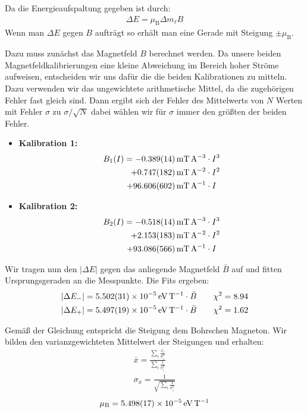 \documentclass[11pt, a4paper]{article}
\begin{document}
Da die Energieaufspaltung gegeben ist durch:
\begin{align}
	\Delta E = \mu_\mathrm{B} \Delta m_\ell B
\end{align}
Wenn man $\Delta E$ gegen $B$ aufträgt so erhält man eine Gerade mit Steigung $\pm \mu_\mathrm{B}$.

Dazu muss zunächst das Magnetfeld $B$ berechnet werden.
Da unsere beiden Magnetfeldkalibrierungen eine kleine Abweichung im Bereich hoher Ströme aufweisen, entscheiden wir uns dafür die die beiden Kalibrationen zu mitteln.
Dazu verwenden wir das ungewichtete arithmetische Mittel, da die zugehörigen Fehler fast gleich sind.
Dann ergibt sich der Fehler des Mittelwerts von $N$ Werten mit Fehler $\sigma$ zu $\sigma/\sqrt{N}$ dabei wählen wir für $\sigma$ immer den größten der beiden Fehler.

\begin{itemize}
	\item \textbf{Kalibration 1:}
	\begin{align}
	B_1(I) = \SI{-0.389 +- 0.014}{\milli\tesla\per\ampere\cubed} &\cdot I^3 \nonumber\\
	       +\SI{0.747+-0.182}{\milli\tesla\per\ampere\squared} &\cdot I^2 \nonumber\\
	       + \SI{96.606 +- 0.602}{\milli\tesla\per\ampere} &\cdot I
	\end{align}
	\item \textbf{Kalibration 2:}
	\begin{align}
	B_2(I) = \SI{-0.518 +- 0.014}{\milli\tesla\per\ampere\cubed} &\cdot I^3 \nonumber\\
	+\SI{2.153+-0.183}{\milli\tesla\per\ampere\squared} &\cdot I^2 \nonumber\\
	+ \SI{93.086 +- 0.566}{\milli\tesla\per\ampere} &\cdot I
	\end{align}
\end{itemize}

Wir tragen nun den $|\Delta E|$ gegen das anliegende Magnetfeld $\bar{B}$ auf und fitten Ursprungsgeraden an die Messpunkte.
Die Fits ergeben:
\begin{align}
	|\Delta E_{-}| = \SI{5.502 +- 0.031e-5}{\electronvolt\per\tesla} \cdot \bar{B} \qquad \chi^2 = 8.94\\
	|\Delta E_{+}| = \SI{5.497 +- 0.019e-5}{\electronvolt\per\tesla} \cdot \bar{B} \qquad \chi^2 = 1.62
\end{align}

Gemäß der Gleichung entspricht die Steigung dem Bohrschen Magneton. Wir bilden den varianzgewichteten Mittelwert der Steigungen und erhalten:
\begin{align}
	\bar{x} = \frac{\sum_i \frac{x_i}{\sigma_i^2}}{\sum_i \frac{1}{\sigma_i^2}} \\
	\sigma_{\bar{x}} = \frac{1}{\sqrt{\sum_i \frac{1}{\sigma_i^2}}}
\end{align}
\begin{align}
	\mu_\mathrm{B} = \SI{5.498 +- 0.017e-5}{\electronvolt\per\tesla}
\end{align}
\end{document}

